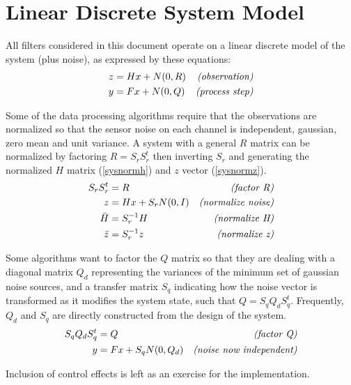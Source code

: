 \section{Linear Discrete System Model}

All filters considered in this document
operate on a linear discrete model
of the system (plus noise), as expressed
by these equations:
\begin{subequations}
\label{sys}
\begin{align}
  z & = H x + N(0,R) & \mbox{\it (observation)}
\label{sysz}
\\
  y & = F x + N(0,Q) & \mbox{\it (process step)}
\label{sysx}
\end{align}
\end{subequations}

Some of the data processing algorithms require
that the observations are normalized so that
the sensor noise on each channel is independent,
gaussian, zero mean and unit variance.
A system with a general $R$ matrix can be normalized
by factoring $R = S_r S_r^t$ then inverting $S_r$ and
generating the normalized $H$ matrix (\ref{sysnormh})
and $z$ vector (\ref{sysnormz}).
\begin{subequations}
\label{sysnorm}
\begin{align}
  S_r S_r^t & = R & \mbox{\it (factor R)}
\\
  z & = H x + S_r N(0,I) & \mbox{\it (normalize noise)}
\\
  {\bar H} & = S_r^{-1} H & \mbox{\it (normalize H)}
\label{sysnormh}
\\
  {\bar z} & = S_r^{-1} z & \mbox{\it (normalize z)}
\label{sysnormz}
\end{align}
\end{subequations}

Some algorithms want to factor the $Q$ matrix
so that they are dealing with a diagonal matrix $Q_d$
representing the variances of the minimum set of
gaussian noise sources,
and a transfer matrix $S_q$ indicating how the
noise vector is transformed as it modifies
the system state, such that $Q = S_q Q_d S_q^t$.
Frequently, $Q_d$ and $S_q$ are directly constructed
from the design of the system.
\begin{subequations}
\label{sysqdiag}
\begin{align}
   S_q Q_d S_q^t & = Q & \mbox{\it (factor Q)}
\\
   y & = F x + S_q N(0,Q_d) & \mbox{\it (noise now independent)}
\label{sysxnorm}
\end{align}
\end{subequations}

Inclusion of control effects
is left as an exercise
for the implementation.
